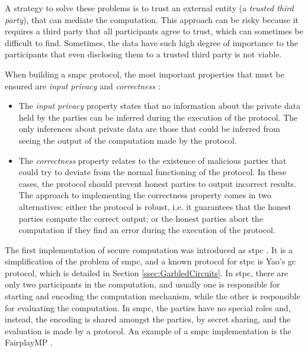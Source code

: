 A strategy to solve these problems is to trust an external entity (a \emph{trusted third party}), that can mediate the computation. This approach can be risky because it requires a third party that all participants agree to trust, which can sometimes be difficult to find. Sometimes, the data have such high degree of importance to the participants that even disclosing them to a trusted third party is not viable.

When building a \ac{smpc} protocol, the most important properties that must be ensured are \textit{input privacy} and \textit{correctness} \cite{goldreich2009foundations}:

\begin{itemize}
    

    \item The \textit{input privacy} property states that no information about the private data held by the parties can be inferred during the execution of the protocol. The only inferences about private data are those that could be inferred from seeing the output of the computation made by the protocol.

    \item The \textit{correctness} property relates to the existence of malicious parties that could try to deviate from the normal functioning of the protocol. In these cases, the protocol should prevent honest parties to output incorrect results. The approach to implementing the correctness property comes in two alternatives: either the protocol is robust, i.e. it guarantees that the honest parties compute the correct output; or the honest parties abort the computation if they find an error during the execution of the protocol.
\end{itemize}

The first implementation of secure computation was introduced as \ac{stpc} \cite{yao1982protocols}. It is a simplification of the problem of \ac{smpc}, and a known protocol for \ac{stpc} is Yao's \ac{gc} protocol, which is detailed in Section \ref{ssec:GarbledCircuits}. In \ac{stpc}, there are only two participants in the computation, and usually one is responsible for starting and encoding the computation mechanism, while the other is responsible for evaluating the computation. In \ac{smpc}, the parties have no special roles and, instead, the encoding is shared amongst the parties, by secret sharing, and the evaluation is made by a protocol. An example of a \ac{smpc} implementation is the FairplayMP \cite{ben2008fairplaymp}.

